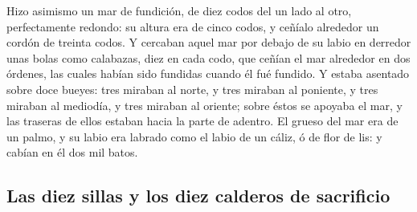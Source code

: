  Hizo asimismo un mar de fundición, de diez codos del un
lado al otro, perfectamente redondo: su altura era de cinco codos, y
ceñíalo alrededor un cordón de treinta codos.  Y cercaban
aquel mar por debajo de su labio en derredor unas bolas como calabazas,
diez en cada codo, que ceñían el mar alrededor en dos órdenes, las
cuales habían sido fundidas cuando él fué fundido.  Y
estaba asentado sobre doce bueyes: tres miraban al norte, y tres miraban
al poniente, y tres miraban al mediodía, y tres miraban al oriente;
sobre éstos se apoyaba el mar, y las traseras de ellos estaban hacia la
parte de adentro.  El grueso del mar era de un palmo, y su
labio era labrado como el labio de un cáliz, ó de flor de lis: y cabían
en él dos mil batos.

\hypertarget{las-diez-sillas-y-los-diez-calderos-de-sacrificio}{%
\subsection{Las diez sillas y los diez calderos de
sacrificio}\label{las-diez-sillas-y-los-diez-calderos-de-sacrificio}}

